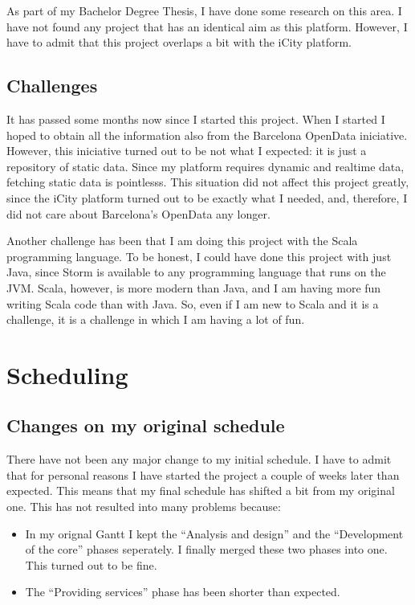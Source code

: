 \documentclass[a4paper,12pt]{article}
\newcommand{\mylist}{
\begin{itemize}
\setlength{\itemsep}{1pt}
\setlength{\parskip}{0pt}
\setlength{\parsep}{0pt}}
\newcommand{\mylistend}{\end{itemize}}
\begin{document}
As part of my Bachelor Degree Thesis, I have done some research on this area. I
have not found any project that has an identical aim as this platform. However,
I have to admit that this project overlaps a bit with the iCity platform.

\subsection{Challenges}

It has passed some months now since I started this project. When I started I
hoped to obtain all the information also from the Barcelona OpenData
iniciative. However, this iniciative turned out to be not what I expected: it
is just a repository of static data. Since my platform requires dynamic and
realtime data, fetching static data is pointlesss. This situation did not
affect this project greatly, since the iCity platform turned out to be exactly
what I needed, and, therefore, I did not care about Barcelona's OpenData any
longer.

Another challenge has been that I am doing this project with the Scala
programming language. To be honest, I could have done this project with just
Java, since Storm is available to any programming language that runs on the
JVM. Scala, however, is more modern than Java, and I am having more fun writing
Scala code than with Java. So, even if I am new to Scala and it is a challenge,
it is a challenge in which I am having a lot of fun.

\section{Scheduling}

\subsection{Changes on my original schedule}

There have not been any major change to my initial schedule. I have to admit
that for personal reasons I have started the project a couple of weeks later
than expected. This means that my final schedule has shifted a bit from my
original one. This has not resulted into many problems because:

\mylist
  \item In my orignal Gantt I kept the ``Analysis and design'' and the
``Development of the core'' phases seperately. I finally merged these two
phases into one. This turned out to be fine.
  \item The ``Providing services'' phase has been shorter than expected.
\mylistend
\end{document}
